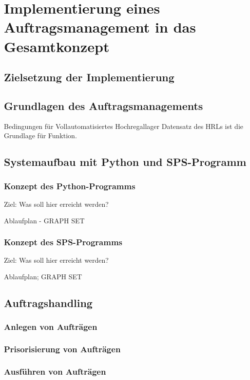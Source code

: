 \section{Implementierung eines Auftragsmanagement in das Gesamtkonzept}


\subsection{Zielsetzung der Implementierung}


\subsection{Grundlagen des Auftragsmanagements}

Bedingungen für Vollautomatisiertes Hochregallager
Datensatz des HRLs ist die Grundlage für Funktion.

\subsection{Systemaufbau mit Python und SPS-Programm}
\subsubsection{Konzept des Python-Programms}
Ziel: Was soll hier erreicht werden?

Ablaufplan - GRAPH SET

\subsubsection{Konzept des SPS-Programms}
Ziel: Was soll hier erreicht werden?

Ablaufplan; GRAPH SET



\subsection{Auftragshandling}
\subsubsection{Anlegen von Aufträgen}
\subsubsection{Prisorisierung von Aufträgen}
\subsubsection{Ausführen von Aufträgen}


